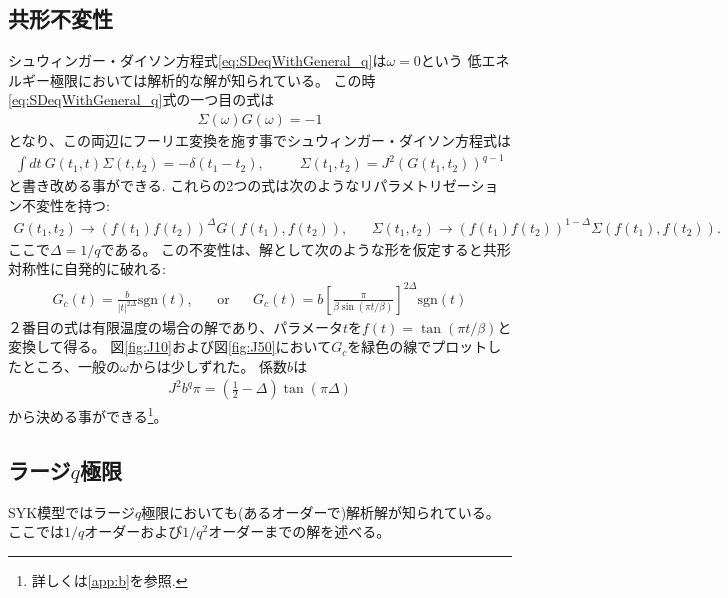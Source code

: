 \subsection{共形不変性}
シュウィンガー・ダイソン方程式\eqref{eq:SDeqWithGeneral_q}は$\omega = 0$という
低エネルギー極限においては解析的な解が知られている。
この時\eqref{eq:SDeqWithGeneral_q}式の一つ目の式は
\begin{align}
	\Sigma(\omega)G(\omega) = -1
\end{align}
となり、この両辺にフーリエ変換を施す事でシュウィンガー・ダイソン方程式は
\begin{align}
	\int dt\ G(t_1, t)\Sigma(t, t_2) = -\delta(t_1 - t_2),
	\hspace{30pt}
	\Sigma(t_1, t_2) = J^2 (G(t_1, t_2))^{q-1}
	\label{eq:conformalSD}
\end{align}
と書き改める事ができる.
これらの2つの式は次のようなリパラメトリゼーション不変性を持つ:
\begin{align}
	G(t_1, t_2) \to (f(t_1)f(t_2))^{\Delta}G(f(t_1),f(t_2)),
	\hspace{20pt}
	\Sigma(t_1, t_2) \to (f(t_1)f(t_2))^{1 - \Delta}\Sigma(f(t_1),f(t_2)).
	\label{eq:reparametrization_of_G_and_Sigma}
\end{align}
ここで$\Delta = 1 / q$である。
この不変性は、解として次のような形を仮定すると共形対称性に自発的に破れる:
\begin{align}
	G_c(t) = \frac{b}{|t|^{2\Delta}}\mathrm{sgn}(t),
	\hspace{20pt}
	\mathrm{or}
	\hspace{20pt}
	G_c(t) = b\left[\frac{\pi}{\beta\sin(\pi t / \beta)}\right]^{2\Delta}\mathrm{sgn}(t)
	\label{eq:conformal_ansatz}
\end{align}
２番目の式は有限温度の場合の解であり、パラメータ$t$を$f(t) = \tan(\pi t / \beta)$と変換して得る。
図\ref{fig:J10}および図\ref{fig:J50}において$G_c$を緑色の線でプロットしたところ、一般の$\omega$からは少しずれた。
係数$b$は
\begin{align}
	J^2 b^q \pi = \left(\frac{1}{2} - \Delta \right)\tan(\pi \Delta)
\end{align}
から決める事ができる\footnote{詳しくは\ref{app:b}を参照.}。

\subsection{ラージ$q$極限}
SYK模型ではラージ$q$極限においても(あるオーダーで)解析解が知られている。
ここでは$1/q$オーダーおよび$1/q^2$オーダーまでの解を述べる。

